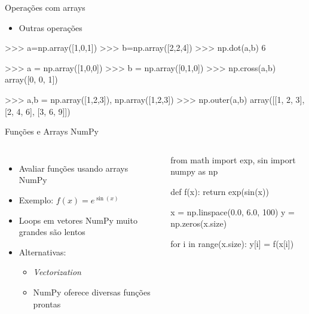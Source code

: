 \documentclass[12pt,t,graphics]{beamer}
\begin{document}
\begin{frame}[t,fragile]{Operações com arrays}
	\begin{itemize}
		\item Outras operações
	\end{itemize}
	\begin{python}
	>>> a=np.array([1,0,1])
	>>> b=np.array([2,2,4])
	>>> np.dot(a,b)
	6
	
	>>> a = np.array([1,0,0])
	>>> b = np.array([0,1,0])
	>>> np.cross(a,b)
	array([0, 0, 1])
	
>>> a,b = np.array([1,2,3]), np.array([1,2,3])
>>> np.outer(a,b)
array([[1, 2, 3],
       [2, 4, 6],
       [3, 6, 9]])
	\end{python}
\end{frame}

\begin{frame}[t,fragile]{Funções e Arrays NumPy}
	\begin{columns}
		\begin{itemize}
			\item Avaliar funções usando arrays NumPy
			\item Exemplo: $f(x) = e^{\sin(x)}$
			\item Loops em vetores NumPy muito grandes são lentos
			\item Alternativas:
			\begin{itemize}
				\item \textit{Vectorization}
				\item NumPy oferece diversas funções prontas
			\end{itemize}
		\end{itemize}
		\begin{python}
from math import exp, sin
import numpy as np
		
def f(x):
    return exp(sin(x))
		
x = np.linspace(0.0, 6.0, 100)
y = np.zeros(x.size)
		
for i in range(x.size):
    y[i] =  f(x[i])
		\end{python}
	\end{columns}
\end{frame}
\end{document}
